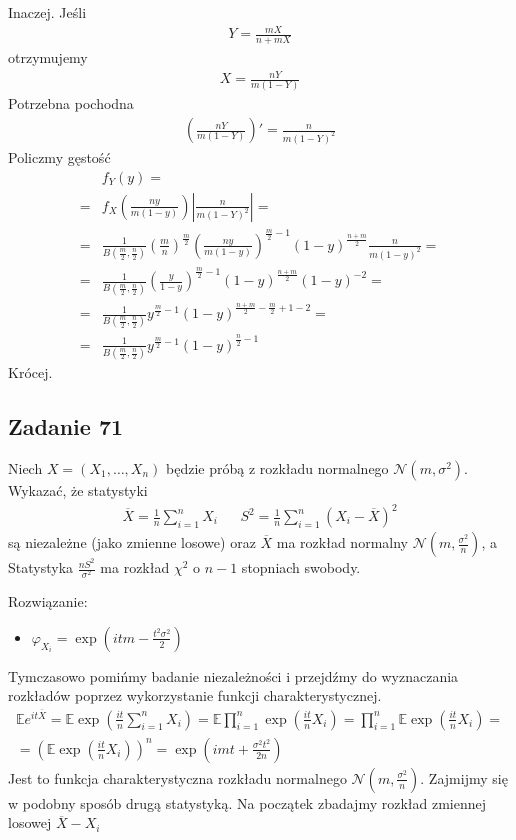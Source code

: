 Inaczej. Jeśli
\begin{gather*}
Y=\frac{mX}{n+mX}
\end{gather*}
otrzymujemy
\begin{gather*}
X=\frac{n Y}{m (1-Y)}
\end{gather*}
Potrzebna pochodna
\begin{gather*}
\left(\frac{n Y}{m (1-Y)}\right)'=
\frac{n}{m (1-Y)^2}
\end{gather*}
Policzmy gęstość
\begin{align*}
&f_Y(y)
=\\=&
f_X\left(\frac{n y}{m (1-y)}\right)\left|\frac{n}{m (1-Y)^2}\right|
=\\=&
\frac{1}{B \left(\frac{m}{2},\frac{n}{2}\right)}\left(\frac{m}{n}\right)^\frac{m}{2}\left(\frac{n y}{m (1-y)}\right)^{\frac{m}{2}-1}\left(1-y\right)^{\frac{n+m}{2}}\frac{n}{m (1-y)^2}
=\\=&
\frac{1}{B \left(\frac{m}{2},\frac{n}{2}\right)}\left(\frac{y}{1-y}\right)^{\frac{m}{2}-1}\left(1-y\right)^{\frac{n+m}{2}} (1-y)^{-2}
=\\=&
\frac{1}{B \left(\frac{m}{2},\frac{n}{2}\right)}y^{\frac{m}{2}-1}\left(1-y\right)^{\frac{n+m}{2}-\frac{m}{2}+1-2}
=\\=&
\frac{1}{B \left(\frac{m}{2},\frac{n}{2}\right)}y^{\frac{m}{2}-1}\left(1-y\right)^{\frac{n}{2}-1}
\end{align*}
Krócej.


\subsection*{Zadanie 71}
Niech $ X=(X_1,\dots,X_n) $ będzie próbą z rozkładu normalnego $ \mathcal N(m,\sigma^2) $. Wykazać, że statystyki
\begin{align*}
\overline X=\frac{1}{n}\sum_{i=1}^{n}X_i
&&
S^2=\frac{1}{n}\sum_{i=1}^{n}\left(X_i-\overline X\right)^2
\end{align*}
są niezależne (jako zmienne losowe) oraz $ \overline X $ ma rozkład normalny $ \mathcal N(m,\frac{\sigma ^2}{n}) $, a Statystyka $ \frac{nS^2}{\sigma^2} $ ma rozkład $ \chi^2 $ o $ n-1 $ stopniach swobody.

Rozwiązanie:
\begin{itemize}
\item $ \varphi_{X_i}=\exp\left(itm-\frac{t^2\sigma^2}{2}\right) $
\end{itemize}
Tymczasowo pomińmy badanie niezależności i przejdźmy do wyznaczania rozkładów poprzez wykorzystanie funkcji charakterystycznej.
\begin{gather*}
\mathbb E e^{it\overline{X}}=
\mathbb E \exp\left(\frac{it}{n}\sum_{i=1}^{n}X_i\right)=
\mathbb E \prod_{i=1}^{n}\exp\left(\frac{it}{n}X_i\right)=
\prod_{i=1}^{n}\mathbb E \exp\left(\frac{it}{n}X_i\right)
=\\=
\left(\mathbb E \exp\left(\frac{it}{n}X_i\right)\right)^n=
\exp\left(i m t+\frac{\sigma ^2 t^2}{2 n}\right)
\end{gather*}
Jest to funkcja charakterystyczna rozkładu normalnego $ \mathcal N(m,\frac{\sigma^2}{n}) $. Zajmijmy się w podobny sposób drugą statystyką.
Na początek zbadajmy rozkład zmiennej losowej $ \overline X - X_i$


